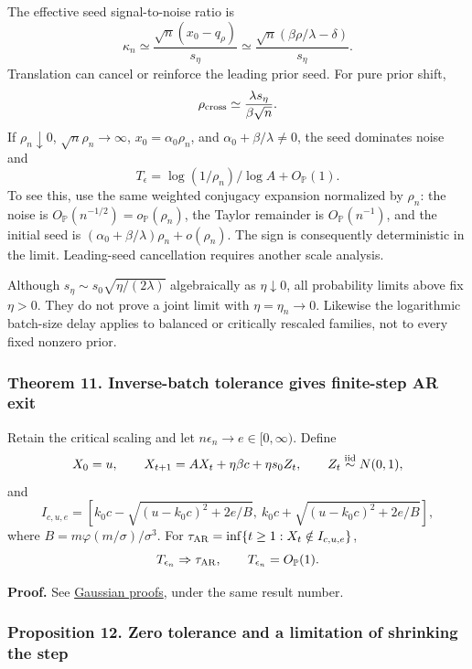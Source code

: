 The effective seed signal-to-noise ratio is \[
\kappa_n\simeq\frac{\sqrt n(x_0-q_\rho)}{s_\eta}
\simeq\frac{\sqrt n(\beta\rho/\lambda-\delta)}{s_\eta}.
\] Translation can cancel or reinforce the leading prior seed. For pure
prior shift, \[
\rho_{\rm cross}\simeq\frac{\lambda s_\eta}{\beta\sqrt n}.
\] If \(\rho_n\downarrow0\), \(\sqrt n\rho_n\to\infty\),
\(x_0=\alpha_0\rho_n\), and \(\alpha_0+\beta/\lambda\ne0\), the seed
dominates noise and \[
T_\epsilon=\log(1/\rho_n)/\log A+O_{\mathbb P}(1).
\] To see this, use the same weighted conjugacy expansion normalized by
\(\rho_n\): the noise is
\(O_{\mathbb P}(n^{-1/2})=o_{\mathbb P}(\rho_n)\), the Taylor remainder
is \(O_{\mathbb P}(n^{-1})\), and the initial seed is
\((\alpha_0+\beta/\lambda)\rho_n+o(\rho_n)\). The sign is consequently
deterministic in the limit. Leading-seed cancellation requires another
scale analysis.

Although \(s_\eta\sim s_0\sqrt{\eta/(2\lambda)}\) algebraically as
\(\eta\downarrow0\), all probability limits above fix \(\eta>0\). They
do not prove a joint limit with \(\eta=\eta_n\to0\). Likewise the
logarithmic batch-size delay applies to balanced or critically rescaled
families, not to every fixed nonzero prior.

\subsubsection{Theorem 11. Inverse-batch tolerance gives finite-step AR
exit}\label{draft-theorem-11.-inverse-batch-tolerance-gives-finite-step-ar-exit}

Retain the critical scaling and let \(n\epsilon_n\to e\in[0,\infty)\).
Define \[
X_0=u,\qquad X_{t+1}=AX_t+\eta\beta c+\eta s_0Z_t,
\qquad Z_t\overset{\rm iid}{\sim}N(0,1),
\] and \[
I_{c,u,e}=
[k_0c-\sqrt{(u-k_0c)^2+2e/B},\
 k_0c+\sqrt{(u-k_0c)^2+2e/B}],
\] where \(B=m\varphi(m/\sigma)/\sigma^3\). For
\(\tau_{\rm AR}=\inf\{t\ge1:X_t\notin I_{c,u,e}\}\), \[
T_{\epsilon_n}\Rightarrow\tau_{\rm AR},\qquad
T_{\epsilon_n}=O_{\mathbb P}(1).
\]

\textbf{Proof.} See \href{gaussian_proofs.md}{Gaussian proofs}, under
the same result number.

\subsubsection{Proposition 12. Zero tolerance and a limitation of
shrinking the
step}\label{draft-proposition-12.-zero-tolerance-and-a-limitation-of-shrinking-the-step}

